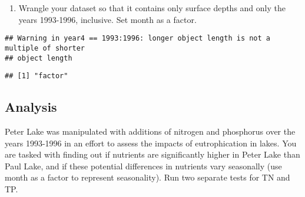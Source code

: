 \documentclass[]{article}
\newenvironment{Shaded}{\begin{snugshade}}{\end{snugshade}}
\newcommand{\DecValTok}[1]{\textcolor[rgb]{0.00,0.00,0.81}{#1}}
\newcommand{\KeywordTok}[1]{\textcolor[rgb]{0.13,0.29,0.53}{\textbf{#1}}}
\newcommand{\NormalTok}[1]{#1}
\newcommand{\OperatorTok}[1]{\textcolor[rgb]{0.81,0.36,0.00}{\textbf{#1}}}
\newcommand{\StringTok}[1]{\textcolor[rgb]{0.31,0.60,0.02}{#1}}
\providecommand{\tightlist}{%
  \setlength{\itemsep}{0pt}\setlength{\parskip}{0pt}}
\begin{document}
\begin{enumerate}
\def\labelenumi{\arabic{enumi}.}
\setcounter{enumi}{2}
\tightlist
\item
  Wrangle your dataset so that it contains only surface depths and only
  the years 1993-1996, inclusive. Set month as a factor.
\end{enumerate}

\begin{Shaded}
\end{Shaded}

\begin{verbatim}
## Warning in year4 == 1993:1996: longer object length is not a multiple of shorter
## object length
\end{verbatim}

\begin{Shaded}
\end{Shaded}

\begin{verbatim}
## [1] "factor"
\end{verbatim}

\hypertarget{analysis}{%
\subsection{Analysis}\label{analysis}}

Peter Lake was manipulated with additions of nitrogen and phosphorus
over the years 1993-1996 in an effort to assess the impacts of
eutrophication in lakes. You are tasked with finding out if nutrients
are significantly higher in Peter Lake than Paul Lake, and if these
potential differences in nutrients vary seasonally (use month as a
factor to represent seasonality). Run two separate tests for TN and TP.
\end{document}
